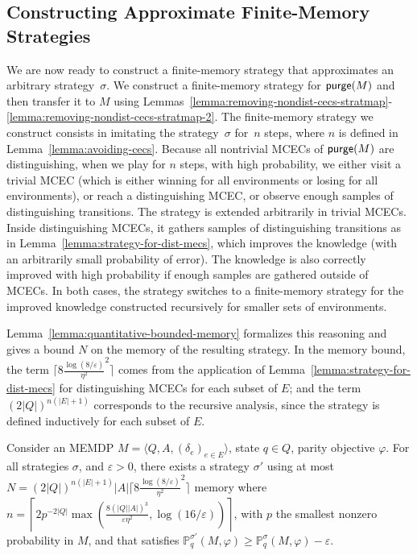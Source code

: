 \documentclass[a4paper,USenglish,cleveref, autoref, thm-restate]{lipics-v2021}
\let\epsilon\varepsilon
\def\abs#1{\ensuremath{\lvert #1 \rvert}}
\newcommand{\tuple}[1]{\langle #1 \rangle}
\newcommand*{\pr}{\mathbb{P}}
\def\Act{A}
\newcommand\purge[1]{\textrm{\sf purge}(#1)}
\begin{document}
\subsection{Constructing Approximate Finite-Memory Strategies}
\label{section:constructing-finite-memory-strategies}

We are now ready to construct a finite-memory strategy that approximates an arbitrary strategy~$\sigma$.
We construct a finite-memory strategy for $\purge{M}$ and then transfer it to $M$ 
using Lemmas~\ref{lemma:removing-nondist-cecs-stratmap}-\ref{lemma:removing-nondist-cecs-stratmap-2}.
The finite-memory strategy we construct consists in imitating the strategy~$\sigma$ for~$n$ steps, where $n$ is defined in Lemma~\ref{lemma:avoiding-cecs}.
Because all nontrivial MCECs of $\purge{M}$ are distinguishing, when we play for $n$ steps, with high probability,
we either visit a trivial MCEC (which is either winning for all environments or losing for all environments), 
or reach a distinguishing MCEC, or observe enough samples of distinguishing transitions.
The strategy is extended arbitrarily in trivial MCECs. Inside distinguishing MCECs, it gathers samples of distinguishing transitions
as in Lemma~\ref{lemma:strategy-for-dist-mecs}, which improves the knowledge (with an arbitrarily small probability of error). The knowledge is also correctly improved with high probability if enough samples are gathered outside of MCECs. 
In both cases, the strategy switches to a finite-memory strategy for the improved knowledge constructed recursively for smaller sets of environments.

Lemma~\ref{lemma:quantitative-bounded-memory} formalizes this reasoning and gives a bound $N$ on the memory of the resulting strategy. In the memory bound, 
the term
$\lceil 8\frac{\log(8/\epsilon)}{\eta^2}^2\rceil$ comes from the application of Lemma~\ref{lemma:strategy-for-dist-mecs} for distinguishing MCECs for each subset of $E$; and the term $(2\abs{Q})^{n(\abs{E}+1)}$ corresponds to the recursive analysis, since the strategy is defined inductively for each subset of $E$.


  \begin{lemma}
    \label{lemma:quantitative-bounded-memory}
    Consider an MEMDP $M=\tuple{Q,A,(\delta_e)_{e\in E}}$, state $q \in Q$, parity objective $\varphi$.
    For all strategies $\sigma$, and $\epsilon>0$,
    there exists a strategy $\sigma'$ 
    using at most 
    $N = (2\abs{Q})^{n(\abs{E}+1)}\abs{\Act}\lceil 8\frac{\log(8/\epsilon)}{\eta^2}^2\rceil$
    memory 
    where $n = \left\lceil 2p^{-2\abs{Q}}\max(\frac{8(\abs{Q}\abs{\Act})^3}{\epsilon\eta^2}, \log(16/\epsilon))\right\rceil$,
    with $p$ the smallest nonzero probability in $M$,
    and that satisfies $\pr_q^{\sigma'}(M, \varphi) \geq \pr_q^{\sigma}(M, \varphi)-\epsilon$.  
 \end{lemma}
\end{document}
